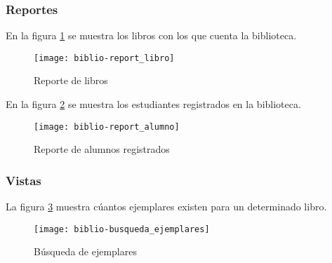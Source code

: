\subsubsection{Reportes}
En la figura \ref{fig:biblio-report_libro} se muestra los libros con los que cuenta la biblioteca.
\begin{figure}[H]
  \centering
  \texttt{[image: biblio-report\_libro]}
  \caption{Reporte de libros}
  \label{fig:biblio-report_libro}
\end{figure}
En la figura \ref{fig:biblio-report_alumno} se muestra los estudiantes registrados en la biblioteca.
\begin{figure}[H]
  \centering
  \texttt{[image: biblio-report\_alumno]}
  \caption{Reporte de alumnos registrados}
  \label{fig:biblio-report_alumno}
\end{figure}
\subsubsection{Vistas}
La figura \ref{fig:biblio-busqueda_ejemplares} muestra cúantos ejemplares existen para un determinado libro.
\begin{figure}[H]
  \centering
  \texttt{[image: biblio-busqueda\_ejemplares]}
  \caption{Búsqueda de ejemplares}
  \label{fig:biblio-busqueda_ejemplares}
\end{figure}